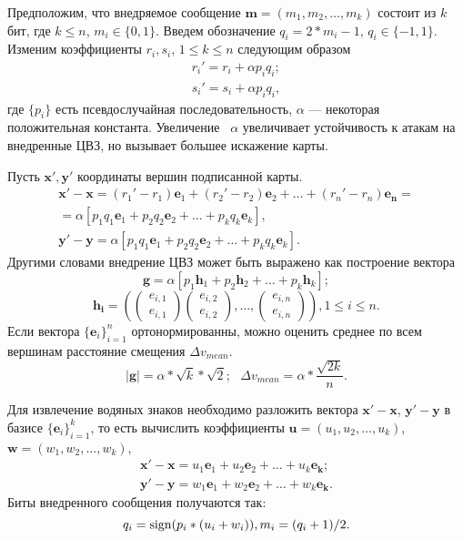 Предположим, что внедряемое сообщение $\mathbf{m} = (m_1, m_2, \dots, m_k)$ состоит из $k$ бит, где $k \le n$, 
$m_i \in \{0, 1\}$. Введем обозначение $q_i = 2 * m_i - 1$, $q_i \in \{-1, 1\}$.
Изменим коэффициенты $r_i, s_i$, $1 \le k \le n$ следующим образом
\begin{eqnarray*}
  r_i' = r_i + \alpha p_i q_i; \\
  s_i' = s_i + \alpha p_i q_i, 
\end{eqnarray*}
где $\{p_i\}$ есть псевдослучайная последовательность, $\alpha$ --- некоторая положительная константа. 
Увеличение ~$\alpha$ увеличивает устойчивость к атакам на внедренные ЦВЗ, но вызывает большее искажение
карты. 

Пусть $\mathbf{x'}, \mathbf{y'}$ координаты вершин подписанной карты. 
\begin{eqnarray*}
  \mathbf{x'} - \mathbf{x} = (r_1' - r_1) \mathbf{e}_1 + (r_2' - r_2) \mathbf{e}_2 + \dots + (r_n' - r_n) \mathbf{e_n} = \\
  = \alpha \left[ p_1 q_1 \mathbf{e}_1 + p_2 q_2 \mathbf{e}_2 + \dots + p_k q_k \mathbf{e}_k \right], \\
  \mathbf{y'} - \mathbf{y} = \alpha \left[ p_1 q_1 \mathbf{e}_1 + p_2 q_2 \mathbf{e}_2 + \dots + p_k q_k \mathbf{e}_k \right]. 
\end{eqnarray*}
Другими словами внедрение ЦВЗ может быть выражено как построение вектора  
\begin{equation}
\label{formula:g}
 \mathbf{g} = \alpha \left[ p_1 \mathbf{h}_1 + p_2 \mathbf{h}_2 + \dots + p_k \mathbf{h}_k \right]; 
\end{equation}
$$ \mathbf{h_i} = \left( \begin{pmatrix} e_{i, 1} \\ e_{i, 1} \end{pmatrix} 
\begin{pmatrix} e_{i, 2} \\ e_{i, 2} \end{pmatrix}, \dots, \begin{pmatrix} e_{i, n} \\e_{i, n}  \end{pmatrix} 
\right), 1 \le i \le n. $$
Если вектора $\{\mathbf{e}_i\}_{i=1}^n$ ортонормированны, можно оценить среднее по всем вершинам расстояние 
смещения $\Delta v_{mean}$.
\begin{equation}
\label{formula:mean_displacement}
|\mathbf{g}| = \alpha * \sqrt {k} * \sqrt{2}; \mbox{      } \Delta v_{mean} = \alpha * \frac{\sqrt{2k}}{n}. 
\end{equation}

Для извлечение водяных знаков необходимо разложить вектора $\mathbf{x'} - \mathbf{x}$, 
$\mathbf{y'} - \mathbf{y}$ в базисе $\{\mathbf{e}_i\}_{i=1}^k$, то есть вычислить коэффициенты 
$\mathbf{u} = (u_1, u_2, \dots, u_k)$, $\mathbf{w} = (w_1, w_2, \dots, w_k)$, 
\begin{eqnarray*}
  \mathbf{x'} - \mathbf{x} = u_1 \mathbf{e}_1 + u_2 \mathbf{e}_2 + \dots + u_k \mathbf{e_k}; \\ 
  \mathbf{y'} - \mathbf{y} = w_1 \mathbf{e}_1 + w_2 \mathbf{e}_2 + \dots + w_k \mathbf{e_k}.  
\end{eqnarray*}
Биты внедренного сообщения получаются так:
$$q_i = \operatorname{sign}(p_i * (u_i + w_i)), m_i = (q_i + 1) / 2.$$
